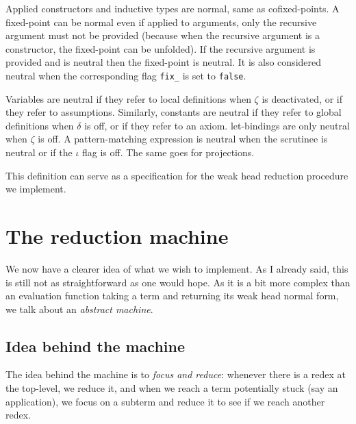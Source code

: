 Applied constructors and inductive types are normal, same as cofixed-points.
A fixed-point can be normal even if applied to arguments, only the recursive
argument must not be provided (because when the recursive argument is a
constructor, the fixed-point can be unfolded).
If the recursive argument is provided and is neutral then the fixed-point is
neutral.
It is also considered neutral when the corresponding flag \texttt{fix_}
is set to \texttt{false}.

Variables are neutral if they refer to local definitions when \(\zeta\) is
deactivated, or if they refer to assumptions.
Similarly, constants are neutral if they refer to global definitions when
\(\delta\) is off, or if they refer to an axiom.
let-bindings are only neutral when \(\zeta\) is off.
A pattern-matching expression is neutral when the scrutinee is neutral or if the
\(\iota\) flag is off. The same goes for projections.

This definition can serve as a specification for the weak head reduction
procedure we implement.

\section{The reduction machine}

We now have a clearer idea of what we wish to implement. As I already said, this
is still not as straightforward as one would hope.
As it is a bit more complex than an evaluation function taking a term and
returning its weak head normal form, we talk about an \emph{abstract machine}.

\subsection{Idea behind the machine}

The idea behind the machine is to \emph{focus and reduce}: whenever there is
a redex at the top-level, we reduce it, and when we reach a term potentially
stuck (say an application), we focus on a subterm and reduce it to see if we
reach another redex.

